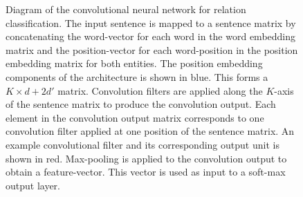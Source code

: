 \begin{figure}[h!]
	\caption{Diagram of the convolutional neural network for relation classification. The input sentence is mapped to a sentence matrix by concatenating the word-vector for each word in the word embedding matrix and the position-vector for each word-position in the position embedding matrix for both entities. The position embedding components of the architecture is shown in blue. This forms a $K \times d + 2d'$ matrix. Convolution filters are applied along the $K$-axis of the sentence matrix to produce the convolution output. Each element in the convolution output matrix corresponds to one convolution filter applied at one position of the sentence matrix. An example convolutional filter and its corresponding output unit is shown in red. Max-pooling is applied to the convolution output to obtain a feature-vector. This vector is used as input to a soft-max output layer.}
	\label{relation_architecture}
\end{figure}
\FloatBarrier
\newpage

\vspace*{1cm}

